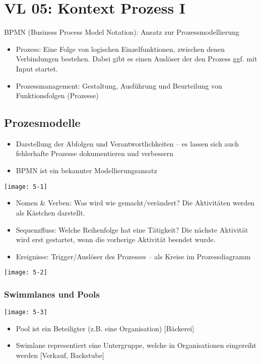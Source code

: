 \section{VL 05: Kontext Prozess I}

BPMN (Business Process Model Notation): Ansatz zur Prozessmodellierung

\begin{itemize}
  \item Prozess: Eine Folge von logischen Einzelfunktionen, zwischen denen Verbindungen bestehen. Dabei gibt es einen Auslöser der den Prozess ggf. mit Input startet.
  \item Prozessmanagement: Gestaltung, Ausführung und Beurteilung von Funktionsfolgen (Prozesse)
\end{itemize}


\subsection{Prozesmodelle}

\begin{itemize}
  \item Darstellung der Abfolgen und Verantwortlichkeiten – es lassen sich auch fehlerhafte Prozesse dokumentieren und verbessern
  \item BPMN ist ein bekannter Modellierungsansatz
\end{itemize}

\texttt{[image: 5-1]}

\begin{itemize}
  \item Nomen \& Verben: Was wird wie gemacht/verändert? Die Aktivitäten werden als Kästchen darstellt.
  \item Sequenzfluss: Welche Reihenfolge hat eine Tätigkeit? Die nächste Aktivität wird erst gestartet, wenn die vorherige Aktivität beendet wurde.
  \item Ereignisse: Trigger/Auslöser des Prozesses – als Kreise im Prozessdiagramm
\end{itemize}

\texttt{[image: 5-2]}


\subsubsection{Swimmlanes und Pools}

\texttt{[image: 5-3]}

\begin{itemize}
  \item Pool ist ein Beteiligter (z.B. eine Organisation) [Bäckerei]
  \item Swimlane representiert eine Untergruppe, welche in Organisationen eingereiht werden [Verkauf, Backstube]
\end{itemize}


